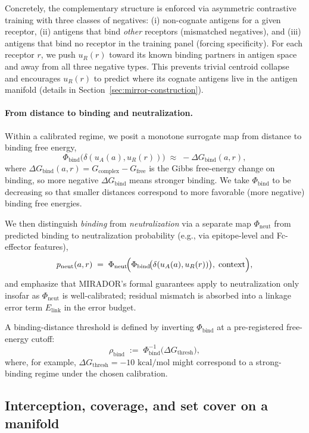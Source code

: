 \documentclass[11pt]{article}
\begin{document}
Concretely, the complementary structure is enforced via asymmetric contrastive training with
three classes of negatives:
(i) non-cognate antigens for a given receptor,
(ii) antigens that bind \emph{other} receptors (mismatched negatives), and
(iii) antigens that bind no receptor in the training panel (forcing specificity).
For each receptor $r$, we push $u_R(r)$ toward its known binding partners in antigen space and
away from all three negative types. This prevents trivial centroid collapse and encourages $u_R(r)$
to predict where its cognate antigens live in the antigen manifold (details in
Section~\ref{sec:mirror-construction}).

\paragraph{From distance to binding and neutralization.}
Within a calibrated regime, we posit a monotone surrogate map from distance to binding free
energy,
\[
\Phi_{\text{bind}}\!\bigl(\delta(u_A(a), u_R(r))\bigr)
\;\approx\;
-\Delta G_{\text{bind}}(a,r),
\]
where $\Delta G_{\text{bind}}(a,r) = G_{\text{complex}} - G_{\text{free}}$ is the Gibbs free-energy change on
binding, so more negative $\Delta G_{\text{bind}}$ means stronger binding. We take
$\Phi_{\text{bind}}$ to be decreasing so that smaller distances correspond to more favorable (more
negative) binding free energies.

We then distinguish \emph{binding} from \emph{neutralization} via a separate map
$\Phi_{\text{neut}}$ from predicted binding to neutralization probability (e.g., via epitope-level and
Fc-effector features),
\[
p_{\text{neut}}(a,r)
\;=\;
\Phi_{\text{neut}}\!\Bigl(\Phi_{\text{bind}}\!\bigl(\delta(u_A(a), u_R(r))\bigr),\; \text{context}\Bigr),
\]
and emphasize that MIRADOR's formal guarantees apply to neutralization only insofar as
$\Phi_{\text{neut}}$ is well-calibrated; residual mismatch is absorbed into a linkage error term
$E_{\text{link}}$ in the error budget.

A binding-distance threshold is defined by inverting $\Phi_{\text{bind}}$ at a pre-registered free-energy
cutoff:
\[
\rho_{\text{bind}}
\;:=\;
\Phi_{\text{bind}}^{-1}\!\bigl(\Delta G_{\text{thresh}}\bigr),
\]
where, for example, $\Delta G_{\text{thresh}} = -10 \text{ kcal/mol}$ might correspond to a strong-binding
regime under the chosen calibration.

\subsection{Interception, coverage, and set cover on a manifold}
\end{document}
